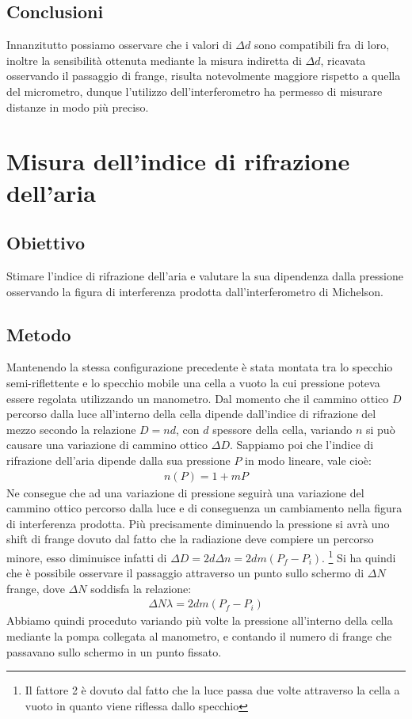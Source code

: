 \documentclass[a4paper]{article}
\begin{document}
\subsection{Conclusioni}
Innanzitutto possiamo osservare che i valori di $\Delta d$ sono compatibili fra di loro, inoltre la sensibilità ottenuta mediante la misura indiretta di $\Delta d$, ricavata osservando il passaggio di frange, risulta notevolmente maggiore rispetto a quella del micrometro, dunque l'utilizzo dell'interferometro ha permesso di misurare distanze in modo più preciso.

\section{Misura dell'indice di rifrazione dell'aria}
\subsection{Obiettivo}
Stimare l'indice di rifrazione dell'aria e valutare la sua dipendenza dalla pressione osservando la figura di interferenza prodotta dall'interferometro di Michelson.

\subsection{Metodo}
Mantenendo la stessa configurazione precedente è stata montata tra lo specchio semi-riflettente e lo specchio mobile una cella a vuoto la cui pressione poteva essere regolata utilizzando un manometro. Dal momento che il cammino ottico $D$ percorso dalla luce all'interno della cella dipende dall'indice di rifrazione del mezzo secondo la relazione $D=nd$, con $d$ spessore della cella, variando $n$ si può causare una variazione di cammino ottico $\Delta D$. Sappiamo poi che l'indice di rifrazione dell'aria dipende dalla sua pressione $P$ in modo lineare, vale cioè: 
\begin{align}
    n(P) = 1 + mP 
\end{align}
Ne consegue che ad una variazione di pressione seguirà una variazione del cammino ottico percorso dalla luce e di conseguenza un cambiamento nella figura di interferenza prodotta. Più precisamente diminuendo la pressione si avrà uno shift di frange dovuto dal fatto che la radiazione deve compiere un percorso minore, esso diminuisce infatti di $\Delta D= 2d \Delta n= 2dm(P_f-P_i)$. \footnote{Il fattore 2 è dovuto dal fatto che la luce passa due volte attraverso la cella a vuoto in quanto viene riflessa dallo specchio} 
Si ha quindi che è possibile osservare il passaggio attraverso un punto sullo schermo di $\Delta N$ frange, dove $\Delta N$ soddisfa la relazione:
\begin{align}
    \Delta N \lambda= 2dm(P_f-P_i)
\label{eq: shift frange pressione aria}
\end{align}
Abbiamo quindi proceduto variando più volte la pressione all'interno della cella mediante la pompa collegata al manometro, e contando il numero di frange che passavano sullo schermo in un punto fissato.
\end{document}
